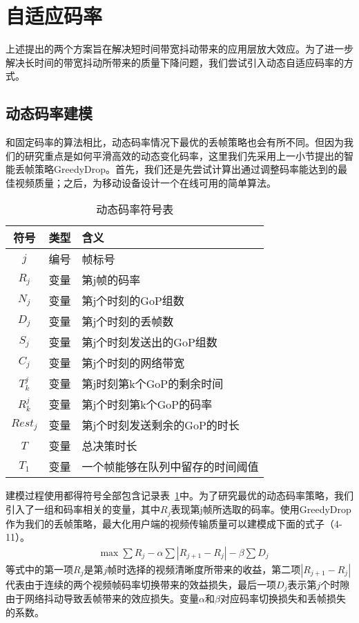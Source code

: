 \section{自适应码率}
上述提出的两个方案旨在解决短时间带宽抖动带来的应用层放大效应。为了进一步解决长时间的带宽抖动所带来的质量下降问题，我们尝试引入动态自适应码率的方式。
\subsection{动态码率建模}
和固定码率的算法相比，动态码率情况下最优的丢帧策略也会有所不同。但因为我们的研究重点是如何平滑高效的动态变化码率，这里我们先采用上一小节提出的智能丢帧策略GreedyDrop。首先，我们还是先尝试计算出通过调整码率能达到的最佳视频质量；之后，为移动设备设计一个在线可用的简单算法。

\begin{table}[tb]
\centering
\caption{动态码率符号表}
\label{vbr_vbr}
    \begin{tabularx}{\linewidth}{ccl}
        \toprule[1.5pt]
        符号 & 类型 & 含义      \\ \midrule[1pt]
        $j$               & 编号         & 帧标号         \\
        $R_j$             & 变量      & 第j帧的码率 \\
        $N_j$             & 变量      & 第j个时刻的GoP组数     \\
        $D_j$             & 变量      & 第j个时刻的丢帧数  \\
        $S_j$             & 变量   & 第j个时刻发送出的GoP组数 \\
        $C_j$              & 变量         & 第j个时刻的网络带宽           \\
        $T_k^j$               & 变量         & 第j时刻第k个GoP的剩余时间  \\
        $R_k^j$            & 变量         & 第j个时刻第k个GoP的码率  \\
        $Rest_j$       & 变量 & 第j个时刻发送剩余的GoP的时长 \\
        $T$               & 变量         & 总决策时长                       \\
        $T_1$               &变量          & 一个帧能够在队列中留存的时间阈值 \\
        \bottomrule[1.5pt]
    \end{tabularx}
\end{table}

建模过程使用都得符号全部包含记录表~\ref{vbr_vbr}中。为了研究最优的动态码率策略，我们引入了一组和码率相关的变量，其中$R_j$表现第j帧所选取的码率。使用GreedyDrop作为我们的丢帧策略，最大化用户端的视频传输质量可以建模成下面的式子（4-11）。
\begin{align}
  & \max \sum R_j- \alpha\sum|R_{j+1}-R_j|-\beta\sum D_j
\end{align}
等式中的第一项$R_j$是第$j$帧时选择的视频清晰度所带来的收益，第二项$|R_{j+1}-R_j|$代表由于连续的两个视频帧码率切换带来的效益损失，最后一项$D_j$表示第$j$个时隙由于网络抖动导致丢帧带来的效应损失。变量$\alpha$和$\beta$对应码率切换损失和丢帧损失的系数。

